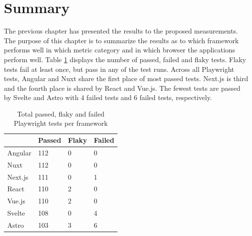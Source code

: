 \documentclass[a4paper, 12pt]{article}
\begin{document}
\section{Summary}\label{sec:summary}

The previous chapter has presented the results to the proposed measurements.
The purpose of this chapter is to summarize the results as to which framework performs well in which metric category and in which browser the applications perform well.
Table \ref{tab:playwright:total} displays the number of passed, failed and flaky tests.
Flaky tests fail at least once, but pass in any of the test runs.
Across all Playwright tests, Angular and Nuxt share the first place of most passed tests.
Next.js is third and the fourth place is shared by React and Vue.js.
The fewest tests are passed by Svelte and Astro with 4 failed tests and 6 failed tests, respectively.
\\

\begin{table}[!ht]
  \centering
  \begin{tabular}{|l|l|l|l|}
    \hline
    ~         & \textbf{Passed} & \textbf{Flaky}  & \textbf{Failed} \\ \hline
    Angular   & 112             & 0               & 0               \\ \hline
    Nuxt      & 112             & 0               & 0               \\ \hline
    Next.js   & 111             & 0               & 1               \\ \hline
    React     & 110             & 2               & 0               \\ \hline
    Vue.js    & 110             & 2               & 0               \\ \hline
    Svelte    & 108             & 0               & 4               \\ \hline
    Astro     & 103             & 3               & 6               \\ \hline
  \end{tabular}
  \caption{Total passed, flaky and failed Playwright tests per framework}
  \label{tab:playwright:total}
\end{table}
\end{document}
